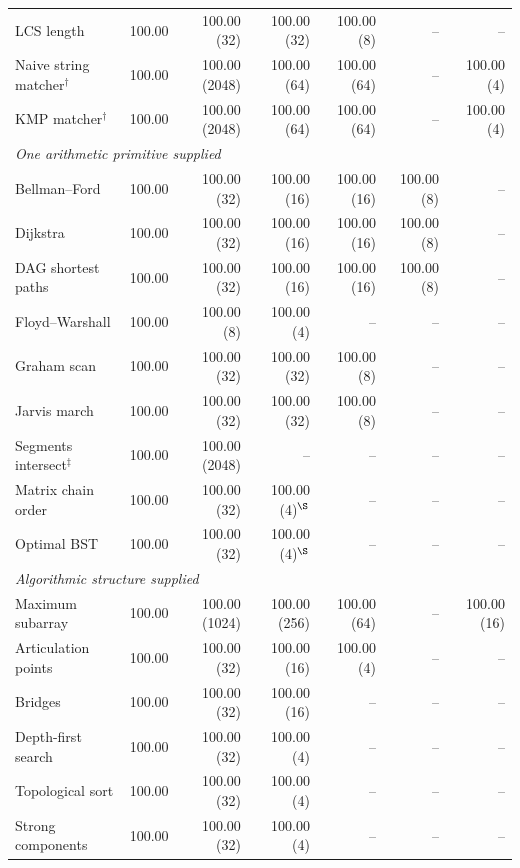 \documentclass[10pt]{article}
\begin{document}
\begin{center}
\begin{tabular}{lrrrrrr}
LCS length & 100.00 & 100.00 (32) & 100.00 (32) & 100.00 (8) & -- & -- \\
Naive string matcher$^\dagger$ & 100.00 & 100.00 (2048) & 100.00 (64) & 100.00 (64) & -- & 100.00 (4) \\
KMP matcher$^\dagger$ & 100.00 & 100.00 (2048) & 100.00 (64) & 100.00 (64) & -- & 100.00 (4) \\
\multicolumn{7}{l}{\textit{One arithmetic primitive supplied}} \\
Bellman--Ford & 100.00 & 100.00 (32) & 100.00 (16) & 100.00 (16) & 100.00 (8) & -- \\
Dijkstra & 100.00 & 100.00 (32) & 100.00 (16) & 100.00 (16) & 100.00 (8) & -- \\
DAG shortest paths & 100.00 & 100.00 (32) & 100.00 (16) & 100.00 (16) & 100.00 (8) & -- \\
Floyd--Warshall & 100.00 & 100.00 (8) & 100.00 (4) & -- & -- & -- \\
Graham scan & 100.00 & 100.00 (32) & 100.00 (32) & 100.00 (8) & -- & -- \\
Jarvis march & 100.00 & 100.00 (32) & 100.00 (32) & 100.00 (8) & -- & -- \\
Segments intersect$^\ddagger$ & 100.00 & 100.00 (2048) & -- & -- & -- & -- \\
Matrix chain order & 100.00 & 100.00 (32) & 100.00 (4)$^\S$ & -- & -- & -- \\
Optimal BST & 100.00 & 100.00 (32) & 100.00 (4)$^\S$ & -- & -- & -- \\
\multicolumn{7}{l}{\textit{Algorithmic structure supplied}} \\
Maximum subarray & 100.00 & 100.00 (1024) & 100.00 (256) & 100.00 (64) & -- & 100.00 (16) \\
Articulation points & 100.00 & 100.00 (32) & 100.00 (16) & 100.00 (4) & -- & -- \\
Bridges & 100.00 & 100.00 (32) & 100.00 (16) & -- & -- & -- \\
Depth-first search & 100.00 & 100.00 (32) & 100.00 (4) & -- & -- & -- \\
Topological sort & 100.00 & 100.00 (32) & 100.00 (4) & -- & -- & -- \\
Strong components & 100.00 & 100.00 (32) & 100.00 (4) & -- & -- & -- \\
\bottomrule\end{tabular}
\end{center}
\end{document}
